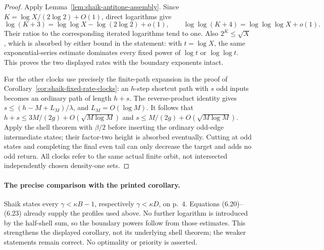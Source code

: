 \documentclass[11pt]{article}
\theoremstyle{remark}\newtheorem{remark}[proposition]{Remark}
\begin{document}
\begin{proof}
Apply Lemma~\ref{lem:shaik-antitone-assembly}. Since
\(K=\log X/(2\log2)+O(1)\), direct logarithms give
\[
 \log(K+3)=\log\log X-\log(2\log2)+o(1),\qquad
 \log\log(K+4)=\log\log\log X+o(1).
\]
Their ratios to the corresponding iterated logarithms tend to one.
Also \(2^K\le\sqrt X\), which is absorbed by either bound in the
statement: with \(t=\log X\), the same exponential-series estimate
dominates every fixed power of \(\log t\) or \(\log\log t\).
This proves the two displayed rates with the boundary exponents intact.

For the other clocks use precisely the finite-path expansion in the
proof of Corollary~\ref{cor:shaik-fixed-rate-clocks}: an \(h\)-step shortcut
path with \(s\) odd inputs becomes an ordinary path of length \(h+s\).
The reverse-product identity gives
\(s\le(h-M+L_M)/\lambda\), and \(L_M=O(\log M)\).
It follows that \(h+s\le3M/(2g)+O(\sqrt{M\log M})\) and
\(s\le M/(2g)+O(\sqrt{M\log M})\).
Apply the shell theorem with \(\beta/2\) before inserting the ordinary
odd-edge intermediate states; their factor-two height is absorbed
eventually. Cutting at odd states and completing the final even tail
can only decrease the target and adds no odd return.
All clocks refer to the same actual finite orbit, not intersected
independently chosen density-one sets.
\end{proof}

\paragraph{The precise comparison with the printed corollary.}
Shaik states every \(\gamma<\kappa B-1\), respectively
\(\gamma<\kappa D\), on p.~4. Equations (6.20)--(6.23) already supply
the profiles used above. No further logarithm is introduced by the
half-shell sum, so the boundary powers follow from those estimates.
This strengthens the displayed corollary, not its underlying shell
theorem; the weaker statements remain correct. No optimality or
priority is asserted.
\end{document}
